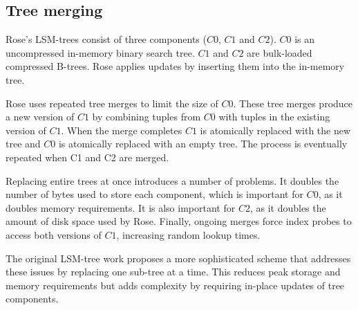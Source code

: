 \documentclass{vldb}
\newcommand{\rows}{Rose\xspace}
\newcommand{\rowss}{Rose's\xspace}
\newcommand{\xxx}[1]{\textcolor{red}{\bf XXX: #1}}
\renewcommand{\xxx}[1]{\xspace}
\begin{document}

\subsection{Tree merging}


\rowss LSM-trees consist of three components ($C0$, $C1$ and $C2$).  $C0$
is an uncompressed in-memory binary search tree.  $C1$ and $C2$
are bulk-loaded compressed B-trees.  \rows applies
updates by inserting them into the in-memory tree.

\rows uses repeated tree merges to limit the size of $C0$.  These tree
merges produce a new version of $C1$ by combining tuples from $C0$ with
tuples in the existing version of $C1$.  When the merge completes
$C1$ is atomically replaced with the new tree and $C0$ is atomically
replaced with an empty tree.  The process is eventually repeated when
C1 and C2 are merged.

Replacing entire trees at once introduces a number of problems.  It
doubles the number of bytes used to store each component, which is
important for $C0$, as it doubles memory requirements.  It is also
important for $C2$, as it doubles the amount of disk space used by
\rows.  Finally, ongoing merges force index probes to access both versions of $C1$,
increasing random lookup times.

The original LSM-tree work proposes a more sophisticated scheme that
addresses these issues by replacing one sub-tree at a time.  This
reduces peak storage and memory requirements but adds complexity
by requiring in-place updates of tree components.
\end{document}
